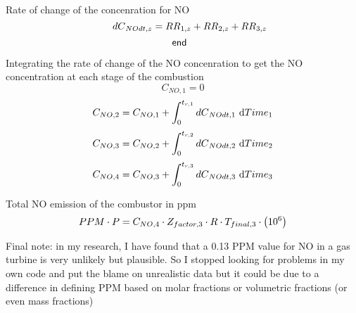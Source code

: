 \documentclass[10pt,fleqn]{article}
\newcommand{\K}[1]{\mbox{\sf#1\ \ \mit}}
\newcommand{\V}[1]{\mbox{$ #1 $}}
\newcommand{\I}{\mbox{\hspace{0.20in}}}
\begin{document}
\vspace{0.04in}
\noindent
\rm Rate of change of the concenration for NO
\begin{equation}
\I \label{EES Eqn:105}
\V{dC} _{NOdt,z} = \V{RR} _{1,z} + \V{RR} _{2,z} + \V{RR} _{3,z} 
\end{equation}
\begin{equation}
\label{EES Eqn:106}
\K{end} 
\end{equation}

\vspace{0.04in}
\noindent
\rm Integrating the rate of change of the NO concenration to get the NO concentration at each stage of the combustion
\begin{equation}
\label{EES Eqn:107}
C_{NO,1} = 0 
\end{equation}
\begin{equation}
\label{EES Eqn:108}
C_{NO,2} = C_{NO,1} + \int_{0}^{t_{r,1}}  \V{dC} _{NOdt,1}\mbox{\ d}\V{Time} _{1}  
\end{equation}
\begin{equation}
\label{EES Eqn:109}
C_{NO,3} = C_{NO,2} + \int_{0}^{t_{r,2}}  \V{dC} _{NOdt,2}\mbox{\ d}\V{Time} _{2}  
\end{equation}
\begin{equation}
\label{EES Eqn:110}
C_{NO,4} = C_{NO,3} + \int_{0}^{t_{r,3}}  \V{dC} _{NOdt,3}\mbox{\ d}\V{Time} _{3}  
\end{equation}

\vspace{0.04in}
\noindent
\rm Total NO emission of the combustor in ppm
\begin{equation}
\label{EES Eqn:111}
\V{PPM}  \cdot  P = C_{NO,4} \cdot  Z_{factor,3} \cdot  R \cdot  T_{final,3} \cdot   \left( 10^{6} \right)  
\end{equation}

\vspace{0.04in}
\noindent
\rm Final note: in my research, I have found that a 0.13 PPM value for NO in a gas turbine is very unlikely but plausible. So I stopped looking for problems in my own code and put the blame on unrealistic data\newline
but it could be due to a difference in defining PPM based on molar fractions or volumetric fractions (or even mass fractions)
\end{document}
